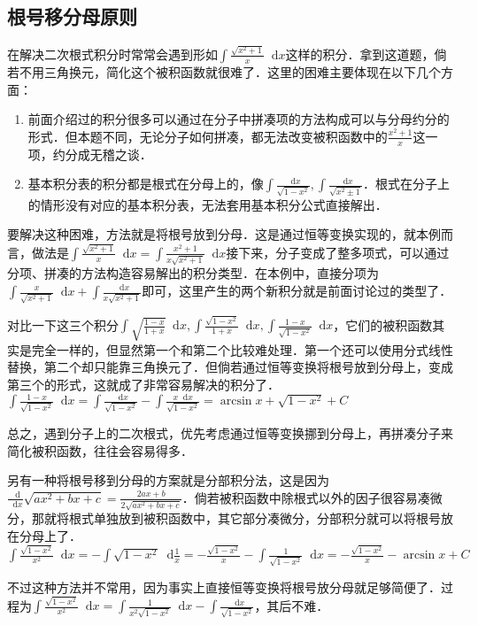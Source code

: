 \documentclass{ctexbook}
\newcommand*{\dif}{\mathop{}\!\mathrm{d}}
\begin{document}
\subsection{根号移分母原则}
在解决二次根式积分时常常会遇到形如$\int\frac{\sqrt{x^{2}+1}}{x}\dif{x}$这样的积分．拿到这道题，倘若不用三角换元，简化这个被积函数就很难了．这里的困难主要体现在以下几个方面：\par
\begin{enumerate}
	\item 前面介绍过的积分很多可以通过在分子中拼凑项的方法构成可以与分母约分的形式．但本题不同，无论分子如何拼凑，都无法改变被积函数中的$\frac{x^{2}+1}{x}$这一项，约分成无稽之谈．
	\item 基本积分表的积分都是根式在分母上的，像$\int\frac{\dif{x}}{\sqrt{1-x^{2}}},\int\frac{\dif{x}}{\sqrt{x^{2}\pm1}}$．根式在分子上的情形没有对应的基本积分表，无法套用基本积分公式直接解出．
\end{enumerate}
要解决这种困难，方法就是将根号放到分母．这是通过恒等变换实现的，就本例而言，做法是$\int\frac{\sqrt{x^{2}+1}}{x}\dif{x}=\int\frac{x^{2}+1}{x\sqrt{x^{2}+1}}\dif{x}$接下来，分子变成了整多项式，可以通过分项、拼凑的方法构造容易解出的积分类型．在本例中，直接分项为$\int\frac{x}{\sqrt{x^{2}+1}}\dif{x}+\int\frac{\dif{x}}{x\sqrt{x^{2}+1}}$即可，这里产生的两个新积分就是前面讨论过的类型了．\par
对比一下这三个积分$\int\sqrt{\frac{1-x}{1+x}}\dif{x},\int\frac{\sqrt{1-x^{2}}}{1+x}\dif{x},\int\frac{1-x}{\sqrt{1-x^{2}}}\dif{x}$，它们的被积函数其实是完全一样的，但显然第一个和第二个比较难处理．第一个还可以使用分式线性替换，第二个却只能靠三角换元了．但倘若通过恒等变换将根号放到分母上，变成第三个的形式，这就成了非常容易解决的积分了．\\
$\int\frac{1-x}{\sqrt{1-x^{2}}}\dif{x}=\int\frac{\dif{x}}{\sqrt{1-x^{2}}}-\int\frac{x\dif{x}}{\sqrt{1-x^{2}}}=\arcsin{x}+\sqrt{1-x^{2}}+C$\par
总之，遇到分子上的二次根式，优先考虑通过恒等变换挪到分母上，再拼凑分子来简化被积函数，往往会容易得多．\par
另有一种将根号移到分母的方案就是分部积分法，这是因为$\frac{\dif}{\dif{x}}\sqrt{ax^{2}+bx+c}=\frac{2ax+b}{2\sqrt{ax^{2}+bx+c}}$．倘若被积函数中除根式以外的因子很容易凑微分，那就将根式单独放到被积函数中，其它部分凑微分，分部积分就可以将根号放在分母上了．\\
$\int\frac{\sqrt{1-x^{2}}}{x^{2}}\dif{x}=-\int\sqrt{1-x^{2}}\dif{\frac{1}{x}}=-\frac{\sqrt{1-x^{2}}}{x}-\int\frac{1}{\sqrt{1-x^{2}}}\dif{x}=-\frac{\sqrt{1-x^{2}}}{x}-\arcsin{x}+C$\par
不过这种方法并不常用，因为事实上直接恒等变换将根号放分母就足够简便了．过程为$\int\frac{\sqrt{1-x^{2}}}{x^{2}}\dif{x}=\int\frac{1}{x^{2}\sqrt{1-x^{2}}}\dif{x}-\int\frac{\dif{x}}{\sqrt{1-x^{2}}}$，其后不难．\par
\end{document}
